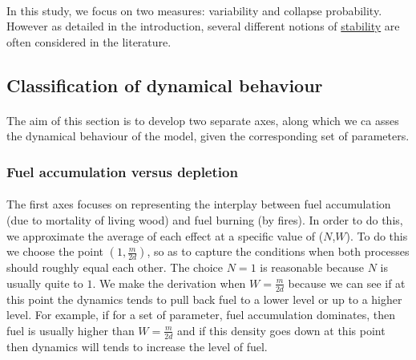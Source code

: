 \documentclass{article}
\begin{document}
\paragraph{}
In this study, we focus on two measures: variability and collapse probability. However as detailed in the introduction, several different notions of \hyperref[stability_litterature]{stability} are often considered in the literature. %

\subsection{Classification of dynamical behaviour}

\label{axes_definition}

\paragraph{}
The aim of this section is to develop two separate axes, along which we ca asses the dynamical behaviour of the model, given the corresponding set of parameters.

\subsubsection{Fuel accumulation versus depletion}

\paragraph{}
The first axes focuses on representing the interplay between fuel accumulation (due to mortality of living wood) and fuel burning (by fires). In order to do this, we approximate the average of each effect at a specific value of ($N$,$W$). To do this we choose the point $(1, \frac{m}{2d})$, so as to capture the conditions when both processes should roughly equal each other. The choice $N=1$ is reasonable because $N$ is usually quite to $1$. We make the derivation when $W = \frac{m}{2d}$ because we can see if at this point the dynamics tends to pull back fuel to a lower level or up to a higher level. For example, if for a set of parameter, fuel accumulation dominates, then fuel is usually higher than $W = \frac{m}{2d}$ and if this density goes down at this point then dynamics will tends to increase the level of fuel.
\end{document}
